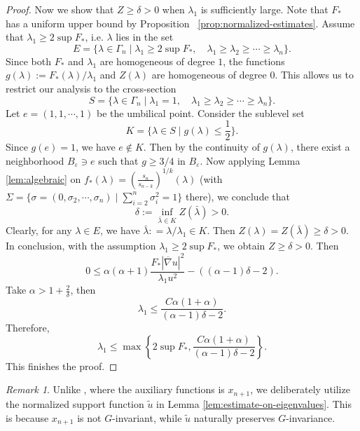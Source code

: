 \documentclass[reqno]{amsart}
\theoremstyle{remark}
\newtheorem{remark}[theorem]{Remark}
\newcommand{\eps}{\ensuremath{\varepsilon}}
\newcommand{\bnabla}{\overline{\nabla}}
\theoremstyle{definition}
\numberwithin{equation}{section}
\begin{document}
\begin{proof}
    Now we show that \(Z \geq \delta >0\) when \(\lambda_1\) is sufficiently large. Note that \(F_*\) has a uniform upper bound by Proposition ~\ref{prop:normalized-estimates}. Assume that \(\lambda_1 \geq 2\sup F_*\), i.e. \(\lambda\) lies in the set
    \[ E = \{\lambda \in \Gamma_n \mid \lambda_1 \geq 2 \sup F_*, \quad\lambda_1\geq \lambda_2\geq \cdots \geq \lambda_n\}. \]
    Since both \(F_*\) and \(\lambda_1\) are homogeneous of degree \(1\), the functions \(g(\lambda) := F_*(\lambda)/\lambda_1\) and \(Z(\lambda)\) are homogeneous of degree \(0\). This allows us to restrict our analysis to the cross-section 
    \[ S = \{\lambda \in \Gamma_n \mid \lambda_1 = 1,\quad \lambda_1\geq \lambda_2\geq \cdots \geq \lambda_n\}.\] 
    Let \(e = (1,1,\cdots,1)\) be the umbilical point. Consider the sublevel set 
    \[ K = \{ \lambda \in S \mid g(\lambda) \leq \frac{1}{2} \}. \]
    Since \(g(e) = 1\), we have \(e\notin K\). Then by the continuity of \(g(\lambda)\), there exist a neighborhood \(B_{\eps}\ni e\) such that \(g\geq 3/4\) in \(B_{\eps}\). Now applying Lemma \ref{lem:algebraic} on \(f_*(\lambda) = \left(\frac{s_n}{s_{n-k}}\right)^{1/k}(\lambda)\) (with \(\Sigma = \{\sigma=(0,\sigma_2,\cdots,\sigma_n)\mid \sum_{i=2}^{n}\sigma_i^2 = 1\}\) there), we conclude that 
    \[ \delta := \inf_{\bar{\lambda} \in K} Z(\bar{\lambda}) > 0. \] 
    Clearly, for any \(\lambda\in E\), we have \(\bar{\lambda}: = \lambda / \lambda_1 \in K\). Then \(Z(\lambda) = Z(\bar{\lambda}) \geq \delta > 0\). 
    In conclusion, with the assumption \(\lambda_1 \geq 2\sup F_*\), we obtain \(Z\geq \delta > 0\). Then
    \[ 0 \leq \alpha(\alpha+1)\frac{F_*|\bnabla u|^2}{\lambda_1 u^2} - ((\alpha-1)\delta - 2). \]
    Take \(\alpha > 1 + \frac{2}{\delta}\), then 
    \[ \lambda_1 \leq \frac{C\alpha(1+\alpha)}{(\alpha-1)\delta - 2}. \]
    Therefore, 
    \[ \lambda_1 \leq \max \left\{ 2\sup F_*, \frac{C\alpha(1+\alpha)}{(\alpha-1)\delta - 2} \right\}. \]
    This finishes the proof.
\end{proof}

\begin{remark}
   Unlike \cite{WX20}, where the auxiliary functions is $x_{n+1}$, we deliberately utilize the normalized support function $\tilde{u}$ in Lemma \ref{lem:estimate-on-eigenvalues}. This is because $x_{n+1}$ is not $G$-invariant, while $\tilde{u}$ naturally preserves $G$-invariance. 
\end{remark}
\end{document}
